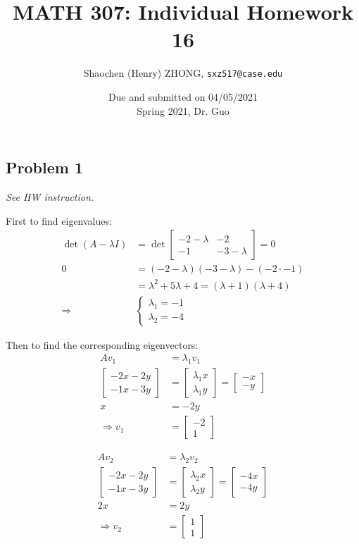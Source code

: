 \documentclass[11pt]{article}
\newcommand{\ilc}{\texttt}
\providecommand{\qbm}[1]{\begin{bmatrix} #1 \end{bmatrix}}
\begin{document}
\title{\textbf{MATH 307: Individual Homework 16}}


\author{Shaochen (Henry) ZHONG, \ilc{sxz517@case.edu}}

\date{Due and submitted on 04/05/2021 \\ Spring 2021, Dr. Guo}
\maketitle



\subsection*{Problem 1}
\textit{See HW instruction.}\newline

First to find eigenvalues:
\begin{align*}
    \det(A - \lambda I) &= \det\qbm{-2-\lambda & -2 \\ -1 & -3-\lambda} = 0 \\
    0 &= (-2-\lambda)(-3-\lambda) - (-2 \cdot -1)  \\
    &= \lambda^2 + 5\lambda + 4 = (\lambda + 1)(\lambda + 4) \\
    \Longrightarrow &\begin{cases}
        \lambda_1 = -1 \\
        \lambda_2 = -4
    \end{cases}
\end{align*}

Then to find the corresponding eigenvectors:
\begin{align*}
    Av_1 &= \lambda_1 v_1 \\
    \qbm{-2x - 2y \\ -1x -3y} &= \qbm{\lambda_1 x \\ \lambda_1 y} = \qbm{-x \\ -y} \\
    x &= -2y \\
    \Longrightarrow v_1 &= \qbm{-2 \\ 1}
\end{align*}

\begin{align*}
    Av_2 &= \lambda_2 v_2 \\
    \qbm{-2x - 2y \\ -1x -3y} &= \qbm{\lambda_2 x \\ \lambda_2 y} = \qbm{-4x \\ -4y} \\
    2x &= 2y \\
    \Longrightarrow v_2 &= \qbm{1 \\ 1}
\end{align*}
\end{document}
